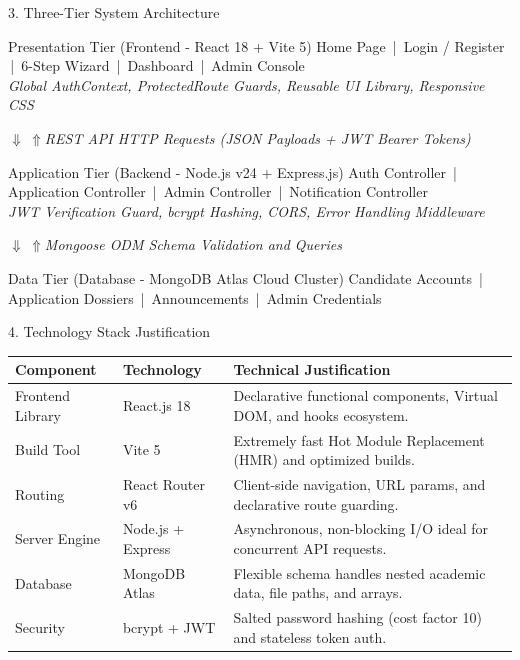 \documentclass[aspectratio=169, 10pt]{beamer}
\begin{document}
\begin{frame}{3. Three-Tier System Architecture}
  \footnotesize
  \begin{block}{Presentation Tier (Frontend - React 18 + Vite 5)}
    \centering
    Home Page \,|\, Login / Register \,|\, 6-Step Wizard \,|\, Dashboard \,|\, Admin Console\\
    \textit{Global AuthContext, ProtectedRoute Guards, Reusable UI Library, Responsive CSS}
  \end{block}

  \centering
  \vspace{-0.3em}
  $\Downarrow\ \Uparrow$\quad\scriptsize\textit{REST API HTTP Requests (JSON Payloads + JWT Bearer Tokens)}
  \vspace{-0.2em}

  \footnotesize
  \begin{block}{Application Tier (Backend - Node.js v24 + Express.js)}
    \centering
    Auth Controller \,|\, Application Controller \,|\, Admin Controller \,|\, Notification Controller\\
    \textit{JWT Verification Guard, bcrypt Hashing, CORS, Error Handling Middleware}
  \end{block}

  \centering
  \vspace{-0.3em}
  $\Downarrow\ \Uparrow$\quad\scriptsize\textit{Mongoose ODM Schema Validation and Queries}
  \vspace{-0.2em}

  \footnotesize
  \begin{block}{Data Tier (Database - MongoDB Atlas Cloud Cluster)}
    \centering
    Candidate Accounts \,|\, Application Dossiers \,|\, Announcements \,|\, Admin Credentials
  \end{block}
\end{frame}

\begin{frame}{4. Technology Stack Justification}
  \footnotesize
  \renewcommand{\arraystretch}{1.5}
  \setlength{\tabcolsep}{5pt}
  \begin{tabularx}{\textwidth}{P{0.7} P{0.8} P{1.5}}
    \toprule
    \textbf{Component} & \textbf{Technology} & \textbf{Technical Justification} \\
    \midrule
    Frontend Library & React.js 18 & Declarative functional components, Virtual DOM, and hooks ecosystem. \\
    Build Tool & Vite 5 & Extremely fast Hot Module Replacement (HMR) and optimized builds. \\
    Routing & React Router v6 & Client-side navigation, URL params, and declarative route guarding. \\
    Server Engine & Node.js + Express & Asynchronous, non-blocking I/O ideal for concurrent API requests. \\
    Database & MongoDB Atlas & Flexible schema handles nested academic data, file paths, and arrays. \\
    Security & bcrypt + JWT & Salted password hashing (cost factor 10) and stateless token auth. \\
    \bottomrule
  \end{tabularx}
\end{frame}
\end{document}
